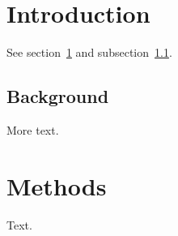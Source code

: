 \documentclass{article}
\begin{document}
\tableofcontents
\section{Introduction}\label{intro}
See section~\ref{intro} and subsection~\ref{sub}.
\subsection{Background}\label{sub}
More text.
\section{Methods}
Text.
\end{document}
